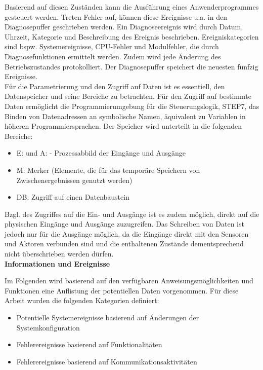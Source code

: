 Basierend auf diesen Zuständen kann die Ausführung eines Anwenderprogrammes gesteuert werden. Treten Fehler auf, können diese Ereignisse u.a. in den Diagnosepuffer geschrieben werden. Ein Diagnoseereignis wird durch Datum, Uhrzeit, Kategorie und Beschreibung des Ereignis beschrieben. Ereigniskategorien sind bspw. Systemereignisse, CPU-Fehler und Modulfehler, die durch Diagnosefunktionen ermittelt werden. Zudem wird jede Änderung des Betriebszustandes protokolliert. Der Diagnosepuffer speichert die neuesten fünfzig Ereignisse. \\

Für die Parametrierung und den Zugriff auf Daten ist es essentiell, den Datenspeicher und seine Bereiche zu betrachten. Für den Zugriff auf bestimmte Daten ermöglicht die Programmierumgebung für die Steuerungslogik, \glqq STEP7\grqq , das Binden von Datenadressen an symbolische Namen, äquivalent zu Variablen in höheren Programmiersprachen. Der Speicher wird unterteilt in die folgenden Bereiche:
\begin{itemize}
\item E: und A: - Prozessabbild der Eingänge und Ausgänge
\item M: Merker (Elemente, die für das temporäre Speichern von Zwischenergebnissen genutzt werden)
\item DB: Zugriff auf einen Datenbaustein
\end{itemize}

Bzgl. des Zugriffes auf die Ein- und Ausgänge ist es zudem möglich, direkt auf die physischen Eingänge und Ausgänge zuzugreifen. Das Schreiben von Daten ist jedoch nur für die Ausgänge möglich, da die Eingänge direkt mit den Sensoren und Aktoren verbunden sind und die enthaltenen Zustände dementsprechend nicht überschrieben werden dürfen. \\

\textbf{Informationen und Ereignisse}

Im Folgenden wird basierend auf den verfügbaren Anweisungsmöglichkeiten und Funktionen eine Auflistung der potentiellen Daten vorgenommen. Für diese Arbeit wurden die folgenden Kategorien definiert:
\begin{itemize}
\item Potentielle Systemereignisse basierend auf Änderungen der Systemkonfiguration
\item Fehlerereignisse basierend auf Funktionalitäten
\item Fehlerereignisse basierend auf Kommunikationsaktivitäten
\end{itemize}


